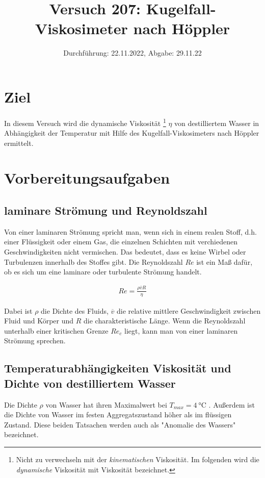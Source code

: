 

\title{Versuch 207: Kugelfall-Viskosimeter nach Höppler}
\date{Durchführung: 22.11.2022, Abgabe: 29.11.22}



\maketitle

\tableofcontents
\newpage

\section{Ziel}
In diesem Versuch wird die dynamische Viskosität
\footnote{Nicht zu verwechseln mit der \textit{kinematischen} Viskosität. Im folgenden wird die \textit{dynamische} Viskosität mit Viskosität bezeichnet.} $\eta$ 
von destilliertem Wasser in Abhängigkeit der Temperatur mit Hilfe des Kugelfall-Viskosimeters nach Höppler ermittelt.

\section{Vorbereitungsaufgaben}
\subsection{laminare Strömung und Reynoldszahl}
Von einer laminaren Strömung spricht man, wenn sich in einem realen Stoff, d.h. einer Flüssigkeit oder einem Gas,
die einzelnen Schichten mit verchiedenen Geschwindigkeiten nicht vermischen. Das bedeutet, dass es keine Wirbel oder
Turbulenzen innerhalb des Stoffes gibt.
Die Reynoldszahl $Re$ ist ein Maß dafür, ob es sich um eine laminare oder turbulente Strömung handelt\cite*[]{geschke}.

\begin{align}
    Re = \frac{\rho \overline{v} R}{\eta}
\end{align}

Dabei ist $\rho$ die Dichte des Fluids, $\overline{v}$ die relative mittlere Geschwindigkeit zwischen Fluid und Körper und
$R$ die charakteristische Länge.
Wenn die Reynoldszahl unterhalb einer kritischen Grenze $Re_c$ liegt, kann man von einer laminaren Strömung sprechen.

\subsection{Temperaturabhängigkeiten Viskosität und Dichte von destilliertem Wasser}
Die Dichte $\rho$ von Wasser hat ihren Maximalwert bei $T_{max} = \qty[]{4}{\degreeCelsius}$ \cite*[]{geschke}.
Außerdem ist die Dichte von Wasser im festen Aggregatszustand höher als im flüssigen Zustand. 
Diese beiden Tatsachen werden auch als "Anomalie des Wassers" bezeichnet\cite*[]{demtroeder}.


